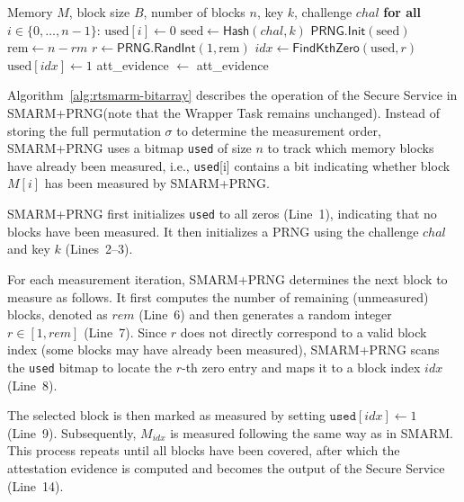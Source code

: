 \documentclass{ieeeaccess}
\newcommand{\rtsmarmone}{SMARM+PRNG\xspace}
\begin{document}
\begin{algorithm}[!t]
\caption{\rtsmarmone (secure world)}
\label{alg:rtsmarm-bitarray}
\begin{algorithmic}[1]
\small
\Notation Memory $M$, block size $B$, number of blocks $n$, key $k$, challenge $chal$
\State \colorbox{codehl}{\textbf{for all} $i \in \{0,\dots,n-1\}$: $\text{used}[i] \gets 0$} 
\State \colorbox{codehl}{$\text{seed} \gets \mathsf{Hash}(chal, k)$}
\State \colorbox{codehl}{$\mathsf{PRNG.Init}(\text{seed})$}
\State {}
    \State \colorbox{codehl}{$\text{rem} \gets n - rm$}
    \State \colorbox{codehl}{$r \gets \mathsf{PRNG.RandInt}(\text{1}, \text{rem})$}
    \State \colorbox{codehl}{$idx \gets \mathsf{FindKthZero}(\text{used}, r)$}
    \State \colorbox{codehl}{$\text{used}[idx] \gets 1$}
    \State {}
    \State {}
    \State {}
\EndFor
\State att\_evidence $\gets$ 
\Output att\_evidence
\end{algorithmic}
\end{algorithm}

Algorithm~\ref{alg:rtsmarm-bitarray} describes the operation of the Secure Service in \rtsmarmone (note that the Wrapper Task remains unchanged).
Instead of storing the full permutation $\sigma$ to determine the measurement order, \rtsmarmone uses a bitmap \texttt{used} of size $n$ to track which memory blocks have already been measured, i.e., \texttt{used}[i] contains a bit indicating whether block $M[i]$ has been measured by \rtsmarmone.

\rtsmarmone first initializes \texttt{used} to all zeros (Line~1), indicating that no blocks have been measured.
It then initializes a PRNG using the challenge $chal$ and key $k$ (Lines~2--3).

For each measurement iteration, \rtsmarmone determines the next block to measure as follows.
It first computes the number of remaining (unmeasured) blocks, denoted as $rem$ (Line~6) and then generates a random integer $r \in [1, rem]$ (Line~7).
Since $r$ does not directly correspond to a valid block index (some blocks may have already been measured), \rtsmarmone scans the \texttt{used} bitmap to locate the $r$-th zero entry and maps it to a block index $idx$ (Line~8).

The selected block is then marked as measured by setting $\texttt{used}[idx] \leftarrow 1$ (Line~9).
Subsequently, $M_{idx}$ is measured following the same way as in SMARM.
This process repeats until all blocks have been covered, after which the attestation evidence is computed and becomes the output of the Secure Service (Line~14).
\end{document}
